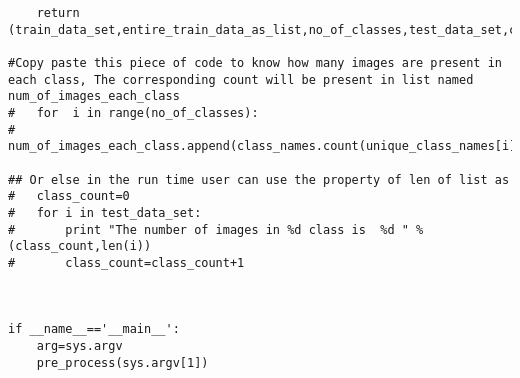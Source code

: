 \documentclass[10pt,a4paper]{article}
\begin{document}
\begin{lstlisting}
	return (train_data_set,entire_train_data_as_list,no_of_classes,test_data_set,count_of_dots_original_path,flag_for_testing)

#Copy paste this piece of code to know how many images are present in each class, The corresponding count will be present in list named num_of_images_each_class
#	for  i in range(no_of_classes):
#		num_of_images_each_class.append(class_names.count(unique_class_names[i]))

## Or else in the run time user can use the property of len of list as 
#	class_count=0
#	for i in test_data_set:
#		print "The number of images in %d class is  %d " %(class_count,len(i)) 
#		class_count=class_count+1



if __name__=='__main__':
	arg=sys.argv
	pre_process(sys.argv[1])



\end{lstlisting}
\end{document}

